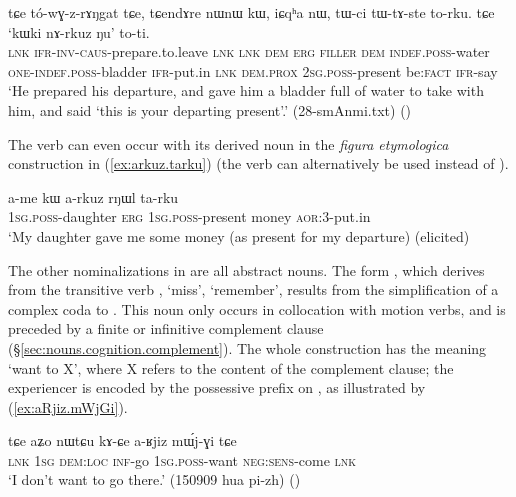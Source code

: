 \begin{exe}
\ex \label{ex:kWki.nArkuz.Nu}
\gll tɕe tó-wɣ-z-rɤŋgat tɕe, tɕendɤre nɯnɯ kɯ, iɕqʰa nɯ,  tɯ-ci tɯ-tɤ-ste to-rku. tɕe `kɯki nɤ-rkuz ŋu' to-ti. \\
\textsc{lnk} \textsc{ifr}-\textsc{inv}-\textsc{caus}-prepare.to.leave \textsc{lnk} \textsc{lnk} \textsc{dem} \textsc{erg} \textsc{filler} \textsc{dem} \textsc{indef}.\textsc{poss}-water \textsc{one}-\textsc{indef}.\textsc{poss}-bladder \textsc{ifr}-put.in \textsc{lnk} \textsc{dem}.\textsc{prox} \textsc{2sg}.\textsc{poss}-present be:\textsc{fact} \textsc{ifr}-say \\
\glt `He prepared his departure, and gave him a bladder full of water to take with him, and said `this is your departing present'.' (28-smAnmi.txt)
()
\end{exe}


The verb  can even occur with its derived noun  in the \textit{figura etymologica} construction in (\ref{ex:arkuz.tarku}) (the verb  can alternatively be used instead of ).

\begin{exe}
\ex \label{ex:arkuz.tarku}
\gll a-me kɯ a-rkuz rŋɯl ta-rku \\
\textsc{1sg}.\textsc{poss}-daughter \textsc{erg} \textsc{1sg}.\textsc{poss}-present money \textsc{aor}:3\flobv{}-put.in \\
\glt `My daughter gave me some money (as present for my departure) (elicited)
\end{exe}

The other nominalizations in  are all abstract nouns. The form , which derives from the transitive verb , `miss', `remember', results from the simplification of a complex coda  to . This noun only occurs in collocation with motion verbs, and is preceded by a finite or infinitive complement clause (§\ref{sec:nouns.cognition.complement}). The whole construction has the meaning `want to X', where X refers to the content of the complement clause; the experiencer is encoded by the possessive prefix on , as illustrated by (\ref{ex:aRjiz.mWjGi}).

\begin{exe}
\ex \label{ex:aRjiz.mWjGi}
\gll  tɕe aʑo nɯtɕu kɤ-ɕe a-ʁjiz mɯ́j-ɣi tɕe \\
\textsc{lnk} \textsc{1sg} \textsc{dem}:\textsc{loc} \textsc{inf}-go \textsc{1sg}.\textsc{poss}-want \textsc{neg}:\textsc{sens}-come \textsc{lnk} \\
\glt `I don't want to go there.' (150909 hua pi-zh)
()
\end{exe}

